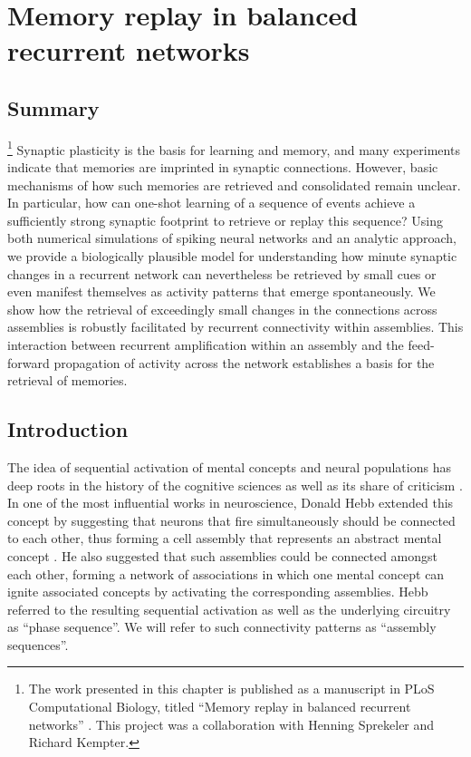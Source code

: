 \chapter{Memory replay in balanced recurrent networks}
\label{chap:asss}

\section{Summary}
\footnote{The work presented in this chapter is published as a manuscript in
PLoS Computational Biology, titled ``Memory replay in balanced recurrent
networks'' \citep{Chenkov2017}. This project was a collaboration with Henning
Sprekeler and Richard Kempter.}
  Synaptic plasticity is the basis for learning and memory, and many
  experiments indicate that memories are imprinted in synaptic connections.
  However, basic mechanisms of how such memories are retrieved and consolidated
  remain unclear. In particular, how can one-shot learning of a sequence of
  events achieve a sufficiently strong synaptic footprint to retrieve or replay
  this sequence? Using both numerical simulations of spiking neural networks
  and an analytic approach, we provide a biologically plausible model for
  understanding how minute synaptic changes in a recurrent network can
  nevertheless be retrieved by small cues or even manifest themselves as
  activity patterns that emerge spontaneously. We show how the retrieval of
  exceedingly small changes in the connections across assemblies is robustly
  facilitated by recurrent connectivity within assemblies. This interaction
  between recurrent amplification within an assembly and the feed-forward
  propagation of activity across the network establishes a basis for the
  retrieval of memories.

\section{Introduction}
  The idea of sequential activation of mental concepts and neural populations
  has deep roots in the history of the cognitive sciences \citep{Titchener1909,
  Brown1914, Washburn1916} as well as its share of criticism
  \citep{Lashley1951}. In one of the most influential works in neuroscience,
  Donald Hebb extended this concept by suggesting that neurons that fire
  simultaneously should be connected to each other, thus forming a cell
  assembly that represents an abstract mental concept \citep{Hebb49}. He also
  suggested that such assemblies could be connected amongst each other, forming
  a network of associations in which one mental concept can ignite associated
  concepts by activating the corresponding assemblies. Hebb referred to the
  resulting sequential activation as well as the underlying circuitry as
  ``phase sequence''. We will refer to such connectivity patterns as ``assembly
  sequences''.

